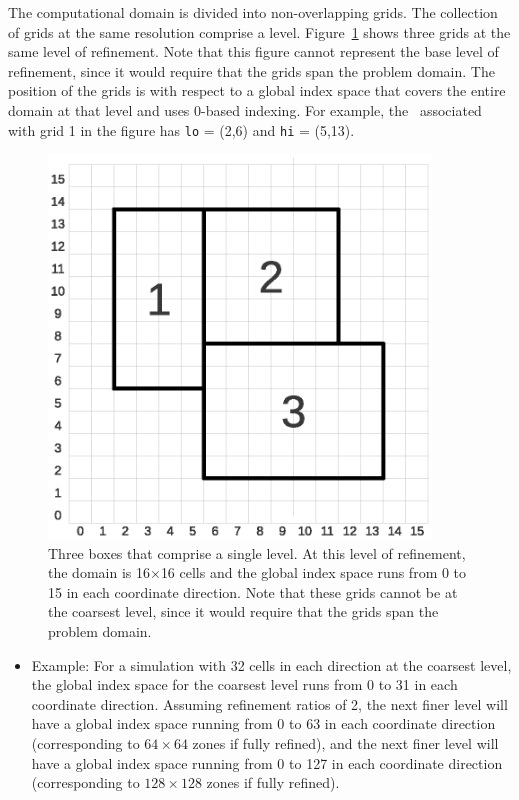 The computational domain is divided into non-overlapping grids.  
The collection of grids at the same resolution comprise a level.
Figure~\ref{fig:boxes} shows three grids at the same level of
refinement.  Note that this figure cannot represent the base level of refinement,
since it would require that the grids span the problem domain.
The position of the grids is with respect to a global
index space that covers the entire domain at that level and uses 0-based indexing.
For example, the \BoxType\ associated with grid 1 
in the figure has {\tt lo} = (2,6) and {\tt hi} = (5,13).
\begin{figure}[tb]
\centering
\includegraphics[width=4.0in]{./Introduction/index_grid2}
\caption{\label{fig:boxes} Three boxes that comprise a single level.
At this level of refinement, the domain is 16$\times$16 cells and
the global index space runs from 0 to 15 in each coordinate direction.
Note that these grids cannot be at the coarsest level,
since it would require that the grids span the problem domain.}
\end{figure}

\begin{itemize}
\item Example: For a simulation with 32 cells in each direction at the coarsest level,
the global index space for the coarsest level runs from 0 to 31 in each coordinate
direction.  Assuming refinement ratios of 2, the next finer level 
will have a global index space running from 
0 to 63 in each coordinate direction (corresponding to $64 \times
64$ zones if fully refined), and the next finer level will have a global index
space running from 0 to 127 in each coordinate direction
(corresponding to $128\times 128$ zones if fully refined).
\end{itemize}

